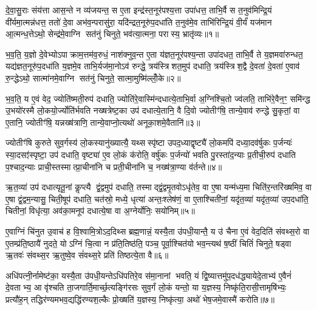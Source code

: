 \setcounter{anuvakam}{0}
दे॒वा॒सु॒राः संय॑त्ता आस॒न्ते न व्य॑जयन्त॒ स ए॒ता इन्द्र॑स्त॒नूर॑पश्य॒त्ता उपा॑धत्त॒ ताभि॒र्वै स त॒नुव॑मिन्द्रि॒यं वी॑र्यमा॒त्मन्न॑धत्त॒ ततो॑ दे॒वा अभ॑व॒न्परासु॑रा॒ यदि॑न्द्रत॒नूरु॑प॒दधा॑ति त॒नुव॑मे॒व ताभि॑रिन्द्रि॒यं वी॒र्यं॑ यज॑मान आ॒त्मन्ध॒त्तेऽथो॒ सेन्द्र॑मे॒वाग्नि सत॑नुं चिनुते॒ भव॑त्या॒त्मना॒ परास्य॒ भ्रातृ॑व्यः॥१॥

भ॒व॒ति॒ य॒ज्ञो दे॒वेभ्योऽपाक्राम॒त्तम॑व॒रुधं॒ नाश॑क्नुव॒न्त ए॒ता य॑ज्ञत॒नूर॑पश्य॒न्ता उपा॑दधत॒ ताभि॒र्वै ते य॒ज्ञमवा॑रुन्धत॒ यद्य॑ज्ञत॒नूरु॑प॒दधा॑ति य॒ज्ञमे॒व ताभि॒र्यज॑मा॒नोऽव॑ रुन्द्धे॒ त्रय॑स्त्रिशत॒मुप॑ दधाति॒ त्रय॑स्त्रिश॒द्वै दे॒वता॑ दे॒वता॑ ए॒वाव॑ रु॒न्द्धेऽथो॒ सात्मा॑नमे॒वाग्नि सत॑नुं चिनुते॒ सात्मा॒मुष्मि॑ल्लोँ॒के॥२॥

भ॒व॒ति॒ य ए॒वं वेद॒ ज्योति॑ष्मती॒रुप॑ दधाति॒ ज्योति॑रे॒वास्मि॑न्दधात्ये॒ताभि॒र्वा अ॒ग्निश्चि॒तो ज्व॑लति॒ ताभि॑रे॒वैन॒ꣳ॒ समि॑न्द्ध उ॒भयो॑रस्मै लो॒कयो॒र्ज्योति॑र्भवति नख्षत्रेष्ट॒का उप॑ दधात्ये॒तानि॒ वै दि॒वो ज्योतीꣳ॑षि॒ तान्ये॒वाव॑ रुन्द्धे सु॒कृतां॒ वा ए॒तानि॒ ज्योतीꣳ॑षि॒ यन्नख्ष॑त्राणि॒ तान्ये॒वाप्नो॒त्यथो॑ अनूका॒शमे॒वैतानि॑॥३॥

ज्योतीꣳ॑षि कुरुते सुव॒र्गस्य॑ लो॒कस्यानु॑ख्यात्यै॒ यथ्सस्पृ॑ष्टा उपद॒ध्याद्वृष्ट्यै॑ लो॒कमपि॑ दध्या॒दव॑र्\mbox{}षुकः प॒र्जन्यः॑ स्या॒दसꣵ॑स्पृष्टा॒ उप॑ दधाति॒ वृष्ट्या॑ ए॒व लो॒कं क॑रोति॒ वर्\mbox{}षु॑कः प॒र्जन्यो॑ भवति पु॒रस्ता॑द॒न्याः प्र॒तीची॒रुप॑ दधाति प॒श्चाद॒न्याः प्राची॒स्तस्मात्प्रा॒चीना॑नि च प्रती॒चीना॑नि च॒ नख्ष॑त्रा॒ण्या व॑र्तन्ते॥४॥

{\anuvakamend[{भ्रातृ॑व्यो लो॒क ए॒वैतान्येक॑चत्वारिशच्च॥१॥}]}

ऋ॒त॒व्या॑ उप॑ दधात्यृतू॒नां कॢप्त्यै द्वं॒द्वमुप॑ दधाति॒ तस्माद्द्वं॒द्वमृ॒तवोऽधृ॑तेव॒ वा ए॒षा यन्म॑ध्य॒मा चिति॑र॒न्तरि॑ख्षमिव॒ वा ए॒षा द्वं॒द्वम॒न्यासु॒ चिती॒षूप॑ दधाति॒ चत॑स्रो॒ मध्ये॒ धृत्या॑ अन्तः॒श्लेष॑णं॒ वा ए॒ताश्चिती॑नां॒ यदृ॑त॒व्या॑ यदृ॑त॒व्या॑ उप॒दधा॑ति॒ चितीनां॒ विधृ॑त्या॒ अव॑का॒मनूप॑ दधात्ये॒षा वा अ॒ग्नेर्योनिः॒ सयो॑निम्॥५॥

ए॒वाग्निं चि॑नुत उ॒वाच॑ ह वि॒श्वामि॒त्रोऽद॒दिथ्स ब्रह्म॒णान्नं॒ यस्यै॒ता उ॑पधी॒यान्तै॒ य उ॑ चैना ए॒वं वेद॒दिति॑ संवथ्स॒रो वा ए॒तम्प्र॑ति॒ष्ठायै॑ नुदते॒ योऽग्निं चि॒त्वा न प्र॑ति॒तिष्ठ॑ति॒ पञ्च॒ पूर्वा॒श्चित॑यो भव॒न्त्यथ॑ ष॒ष्ठीं चितिं॑ चिनुते॒ षड्वा ऋ॒तवः॑ संवथ्स॒र ऋ॒तुष्वे॒व सं॑वथ्स॒रे प्रति॑ तिष्ठत्ये॒ता वै॥६॥

अधि॑पत्नी॒र्नामेष्ट॑का॒ यस्यै॒ता उ॑पधी॒यन्तेऽधि॑पतिरे॒व स॑मा॒नानां भवति॒ यं द्वि॒ष्यात्तमु॑प॒दध॑द्ध्यायेदे॒ताभ्य॑ ए॒वैनं॑ दे॒वताभ्य॒ आ वृ॑श्चति ता॒जगार्ति॒मार्च्छ॒त्यङ्गि॑रसः सुव॒र्गं लो॒कं यन्तो॒ या य॒ज्ञस्य॒ निष्कृ॑ति॒रासी॒त्तामृषि॑भ्यः॒ प्रत्यौ॑ह॒न् तद्धिर॑ण्यमभव॒द्यद्धि॑रण्यश॒ल्कैः प्रो॒ख्षति॑ य॒ज्ञस्य॒ निष्कृ॑त्या॒ अथो॑ भेष॒जमे॒वास्मै॑ करोति॥७॥

